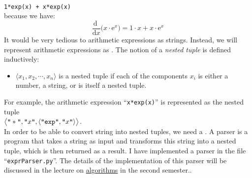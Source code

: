 \\[0.2cm]
\hspace*{1.3cm}
\texttt{1*exp(x) + x*exp(x)}
\\[0.2cm]
because we have:
$$ \frac{\mathrm{d}\;}{\mathrm{d}x} \bigl( x \cdot \mathrm{e}^x \bigr) = 1 \cdot x + x \cdot \mathrm{e}^x $$
It would be very tedious to  arithmetic expressions as strings.  Instead, we will represent
arithmetic expressions as .  
The notion of a \emph{nested tuple} is defined inductively:
\begin{itemize}
\item $\langle x_1, x_2, \cdots, x_n \rangle$ is a nested tuple if each of the components $x_i$ is either a
      number, a string, or is itself a nested tuple.
\end{itemize}
For example, the arithmetic expression ``\texttt{x*exp(x)}'' is represented as the nested tuple
\\[0.2cm]
\hspace*{1.3cm}
$\bigl\langle\texttt{\symbol{34}}*\texttt{\symbol{34}}, \texttt{\symbol{34}}x\texttt{\symbol{34}}, \langle \texttt{\symbol{34}}\mathtt{exp}\texttt{\symbol{34}}, \texttt{\symbol{34}}x\texttt{\symbol{34}} \rangle\bigr\rangle$.
\\[0.2cm]
In order to be able to convert string into nested tuples, we need a .
  A parser is a program that
takes a string as input and transforms this string into a nested tuple, which is then returned as a result.
I have implemented a parser in the file ``\texttt{exprParser.py}''.  The details of the implementation of this
parser will be discussed in the lecture on
\href{https://github.com/karlstroetmann/Algorithms/blob/master/Lecture-Notes/algorithms.pdf}{algorithms} in the
second semester..

